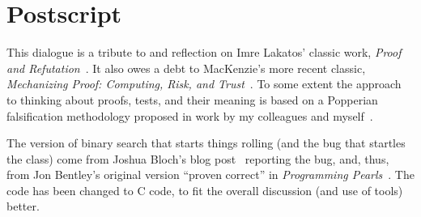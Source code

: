 \documentclass[sigplan]{acmart}
\begin{document}
\section{Postscript}

This dialogue is a tribute to and reflection on Imre Lakatos' classic
work, \emph{Proof and Refutation}~\cite{lakatos1963proofs}.  It also
owes a debt to MacKenzie's more recent classic, \emph{Mechanizing
  Proof: Computing, Risk, and Trust}~\cite{mackenzie2004mechanizing}.
To some extent the approach to thinking about proofs, tests, and their
meaning is based on a Popperian falsification methodology proposed in
work by my colleagues and myself~\cite{ASE15,ASEJ}.

The version of binary search that starts things rolling (and the bug
that startles the class) come from Joshua Bloch's blog post~\cite{bloch} reporting
the bug, and, thus, from Jon Bentley's original version ``proven
correct'' in \emph{Programming Pearls}~\cite{Pearls}.  The code has
been changed to C code, to fit the overall discussion (and use of
tools) better.



\end{document}
